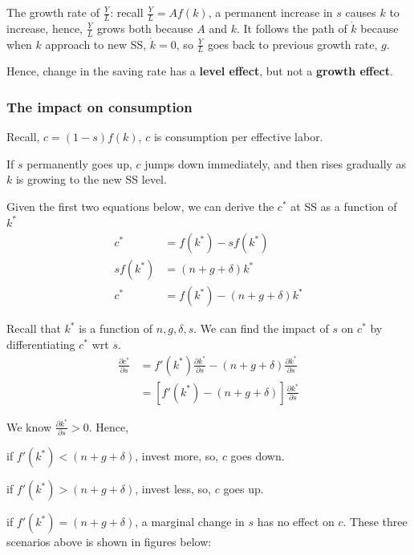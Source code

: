 \documentclass[12pt]{article}
\begin{document}
The growth rate of $ \frac{Y}{L} $:
recall $ \frac{Y}{L} = Af(k) $, a permanent increase in $ s $ causes $ k $ to increase,
hence, $ \frac{Y}{L} $ grows both because $ A $ and $ k $. It follows the path
of $ \dot{k} $ because when $ k $ approach to new SS, $ \dot{k} = 0 $, so $ \frac{Y}{L}
$ goes back to previous growth rate, $ g $.

Hence, change in the saving rate has a {\textbf {level effect}}, but not a 
{\textbf {growth effect}}.


\subsubsection{The impact on consumption}

Recall, $ c = (1 - s)f(k) $, $ c $ is consumption per effective labor.

If $ s $ permanently goes up, $ c $ jumps down immediately, and then rises gradually
as $ k $ is growing to the new SS level.

Given the first two equations below, we can derive the $ c^{*} $ at SS as a function
of $ k ^{*} $
\begin{align*}
c^{*} &= f(k ^{*}) - sf(k ^{*})\\
sf(k ^{*}) &= (n + g + \delta)k ^{*}\\
c^{*} &= f(k ^{*}) - (n + g + \delta)k ^{*}
\end{align*}

Recall that $ k ^{*} $ is a function of $ n, g, \delta, s $. We can find the impact
of $ s $ on $ c^{*} $ by differentiating $ c^{*} $ wrt $ s $.
\begin{align*}
\frac{\partial c^{*} }{\partial s }&= f'(k ^{*})\frac{\partial k ^{*} }{\partial s }
 - (n + g + \delta) \frac{\partial k ^{*} }{\partial s }\\
&= [f'(k ^{*}) - (n + g + \delta)]\frac{\partial k ^{*} }{\partial s }
\end{align*}

We know $ \frac{\partial k ^{*} }{\partial s } > 0 $. Hence,

if  $ f'(k ^{*}) < (n + g + \delta) $, invest more, so, $ c $ goes down.

if  $ f'(k ^{*}) > (n + g + \delta) $, invest less, so, $ c $ goes up.

if  $ f'(k ^{*}) = (n + g + \delta) $, a marginal change in $ s $ has no effect on 
$ c $.
These three scenarios above is shown in figures below:\\

\newpage
\end{document}
